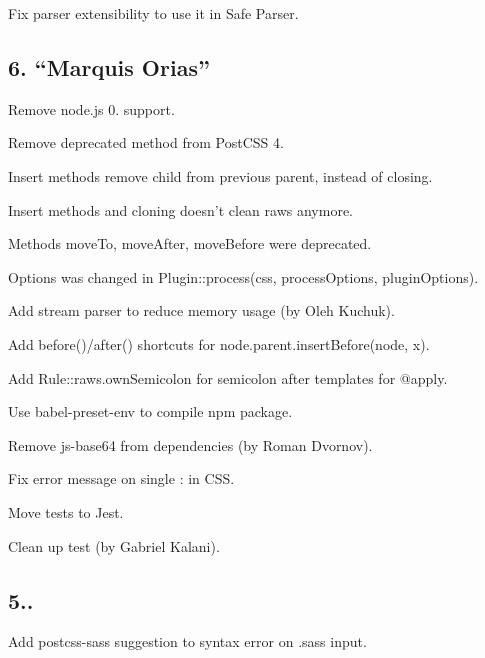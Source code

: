 \begin{DoxyItemize}
\item Fix parser extensibility to use it in Safe Parser.
\end{DoxyItemize}

\subsection*{6. “\+Marquis Orias”}


\begin{DoxyItemize}
\item Remove node.\+js 0. support.
\item Remove deprecated method from Post\+C\+SS 4.
\item Insert methods remove child from previous parent, instead of closing.
\item Insert methods and cloning doesn’t clean {\ttfamily raws} anymore.
\item Methods {\ttfamily move\+To}, {\ttfamily move\+After}, {\ttfamily move\+Before} were deprecated.
\item Options was changed in {\ttfamily Plugin\+::process(css, process\+Options, plugin\+Options)}.
\item Add stream parser to reduce memory usage (by Oleh Kuchuk).
\item Add {\ttfamily before()}/{\ttfamily after()} shortcuts for {\ttfamily node.\+parent.\+insert\+Before(node, x)}.
\item Add {\ttfamily Rule\+::raws.\+own\+Semicolon} for semicolon after templates for {\ttfamily @apply}.
\item Use {\ttfamily babel-\/preset-\/env} to compile npm package.
\item Remove {\ttfamily js-\/base64} from dependencies (by Roman Dvornov).
\item Fix error message on single {\ttfamily \+:} in C\+SS.
\item Move tests to Jest.
\item Clean up test (by Gabriel Kalani).
\end{DoxyItemize}

\subsection*{5..}


\begin{DoxyItemize}
\item Add {\ttfamily postcss-\/sass} suggestion to syntax error on {\ttfamily .sass} input.
\end{DoxyItemize}

